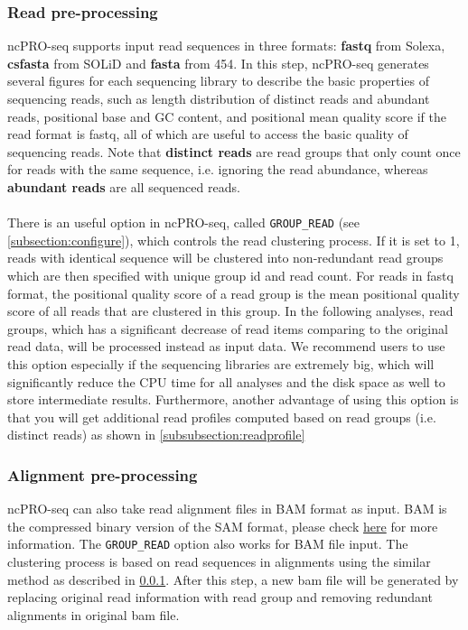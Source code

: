 \documentclass[12pt]{article}
\def \ncpip{ncPRO-seq}
\begin{document}
\subsubsection{Read pre-processing}
\label{subsubsection:readpreprocess}
\ncpip{} supports input read sequences in three formats: \textbf{fastq} from Solexa, \textbf{csfasta} from SOLiD  and \textbf{fasta} from 454. In this step, \ncpip{} generates several figures for each sequencing library to describe the basic properties of sequencing reads, such as length distribution of distinct reads and abundant reads, positional base and GC content, and positional mean quality score if the read format is fastq, all of which are useful to access the basic quality of sequencing reads. Note that \textbf{distinct reads} are read groups that only count once for reads with the same sequence, i.e. ignoring the read abundance, whereas \textbf{abundant reads} are all sequenced reads. \\\\
There is an useful option in \ncpip{}, called \verb+GROUP_READ+ (see \ref{subsection:configure}), which controls the read clustering process. If it is set to 1, reads with identical sequence will be clustered into non-redundant read groups which are then specified with unique group id and read count. For reads in fastq format, the positional quality score of a read group is the mean positional quality score of all reads that are clustered in this group. In the following analyses, read groups, which has a significant decrease of read items comparing to the original read data, will be processed instead as input data. We recommend users to use this option especially if the sequencing libraries are extremely big, which will significantly reduce the CPU time for all analyses and the disk space as well to store intermediate results. Furthermore, another advantage of using this option is that you will get additional read profiles computed based on read groups (i.e. distinct reads) as shown in \ref{subsubsection:readprofile} 

\subsubsection{Alignment pre-processing}
\ncpip{} can also take read alignment files in BAM format as input. BAM is the compressed binary version of the SAM format, please check \href{http://samtools.sourceforge.net/}{ here} for more information. The \verb+GROUP_READ+ option also works for BAM file input. The clustering process is based on read sequences in alignments using the similar method as described in \ref{subsubsection:readpreprocess}. After this step, a new bam file will be generated by replacing original read information with read group and removing redundant alignments in original bam file.
\end{document}
